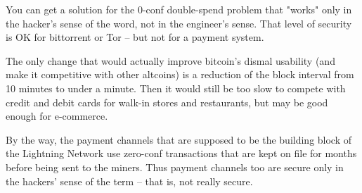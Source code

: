 You can get a solution for the 0-conf double-spend problem that "works" only in the hacker's sense of the word, not in the engineer's sense. That level of security is OK for bittorrent or Tor -- but not for a payment system.

The only change that would actually improve bitcoin's dismal usability (and make it competitive with other altcoins) is a reduction of the block interval from 10 minutes to under a minute. Then it would still be too slow to compete with credit and debit cards for walk-in stores and restaurants, but may be good enough for e-commerce.

By the way, the payment channels that are supposed to be the building block of the Lightning Network use zero-conf transactions that are kept on file for months before being sent to the miners. Thus payment channels too are secure only in the hackers' sense of the term -- that is, not really secure.
